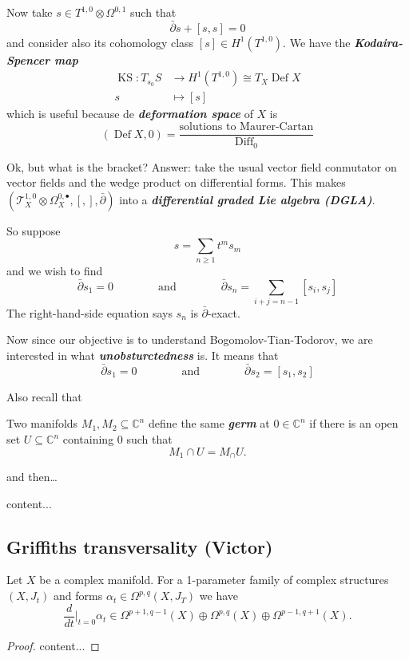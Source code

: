 \vspace{2em}
Now take $s\in T^{1,0}\otimes\Omega^{0,1}$ such that
\[\bar\partial s+[s,s]=0\]
and consider also its cohomology class $[s]\in H^1(T^{1,0})$. We have the \textbf{\textit{Kodaira-Spencer map}}
\begin{align*}
	\operatorname{KS}:T_{s_0}S&\to H^1(T^{1,0})\cong T_X \operatorname{Def} X\\
	s&\mapsto [s]
\end{align*}
which is useful because de \textbf{\textit{deformation space}} of $X$ is
\[(\operatorname{Def} X,0)=\frac{\text{solutions to Maurer-Cartan}}{\operatorname{Dif f}_0}\]

Ok, but what is the bracket? Answer: take the usual vector field conmutator on vector fields and the wedge product on differential forms. This makes $(\mathcal{T}^{1,0}_X\otimes \Omega^{0,\bullet}_X,[,],\bar\partial)$ into a \textbf{\textit{differential graded Lie algebra (DGLA)}}.

So suppose
\[s=\sum_{n\geq1}t^ms_m\]
and we wish to find
\[\bar\partial s_1=0\qquad\qquad\text{and}\qquad\qquad \bar\partial s_n=\sum_{i+j=n-1}[s_i,s_j]\]
The right-hand-side equation says $s_n$ is $\bar\partial$-exact.

Now since our objective is to understand Bogomolov-Tian-Todorov, we are interested in what \textbf{\textit{unobsturctedness}} is. It means that
\[\bar\partial s_1=0\qquad\qquad\text{and}\qquad\qquad\bar\partial s_2=[s_1,s_2]\]

Also recall that
\begin{defn}
	Two manifolds $M_1,M_2\subseteq\mathbb{C}^n$ define the same \textbf{\textit{germ}} at $0\in\mathbb{C}^n$ if there is an open set $U\subseteq \mathbb{C}^n$ containing $0$ such that
	\[M_1\cap U=M_\cap U.\]
\end{defn}
and then…
\begin{thm}
	content...
\end{thm}

\subsection{Griffiths transversality (Victor)}
\begin{claim}
	Let $X$ be a complex manifold. For a 1-parameter family of complex structures $(X,J_t)$ and forms $\alpha_t\in\Omega^{p,q}(X,J_T)$ we have
\[\frac{d}{dt}\Big|_{t=0}\alpha_t\in\Omega^{p+1,q-1}(X)\oplus\Omega^{p,q}(X)\oplus\Omega^{p-1,q+1}(X).\]
\end{claim}
\begin{proof}
	{\color{magenta}content...}
\end{proof}

